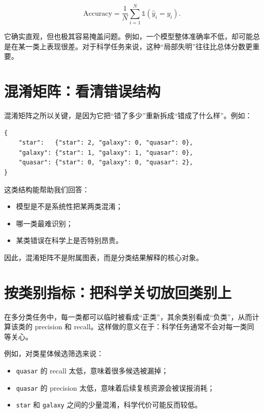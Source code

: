 \[
\mathrm{Accuracy} =
\frac{1}{N}
\sum_{i=1}^{N}
\mathbb{1}(\hat{y}_i = y_i).
\]

它确实直观，但也极其容易掩盖问题。例如，一个模型整体准确率不低，却可能总是在某一类上表现很差。对于科学任务来说，这种“局部失明”往往比总体分数更重要。

\section{混淆矩阵：看清错误结构}

混淆矩阵之所以关键，是因为它把“错了多少”重新拆成“错成了什么样”。例如：

\begin{examplebox}[一个最小混淆矩阵结构]
\begin{lstlisting}[style=pythonstyle]
{
    "star":   {"star": 2, "galaxy": 0, "quasar": 0},
    "galaxy": {"star": 1, "galaxy": 1, "quasar": 0},
    "quasar": {"star": 0, "galaxy": 0, "quasar": 2},
}
\end{lstlisting}
\end{examplebox}

这类结构能帮助我们回答：

\begin{itemize}
    \item 模型是不是系统性把某两类混淆；
    \item 哪一类最难识别；
    \item 某类错误在科学上是否特别昂贵。
\end{itemize}

因此，混淆矩阵不是附属图表，而是分类结果解释的核心对象。

\section{按类别指标：把科学关切放回类别上}

在多分类任务中，每一类都可以临时被看成“正类”，其余类别看成“负类”，从而计算该类的 precision 和 recall。这样做的意义在于：科学任务通常不会对每一类同等关心。

例如，对类星体候选筛选来说：

\begin{itemize}
    \item \texttt{quasar} 的 recall 太低，意味着很多候选被漏掉；
    \item \texttt{quasar} 的 precision 太低，意味着后续复核资源会被误报消耗；
    \item \texttt{star} 和 \texttt{galaxy} 之间的少量混淆，科学代价可能反而较低。
\end{itemize}

